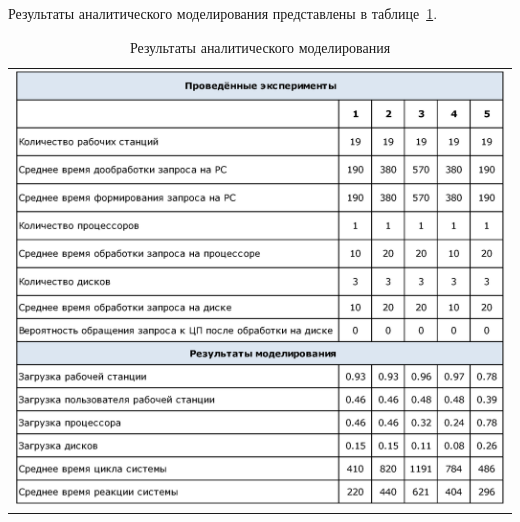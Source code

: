 \newpage

Результаты аналитического моделирования представлены в таблице~\ref{table:anal_result}.

\begin{table}[h]
\caption{Результаты аналитического моделирования}
\label{table:anal_result}
\centering
 \begin{tabular}{c}
 \includegraphics[width=0.7\linewidth]{pics/pic10_1_anal_result.eps}
 \end{tabular}
\end{table}